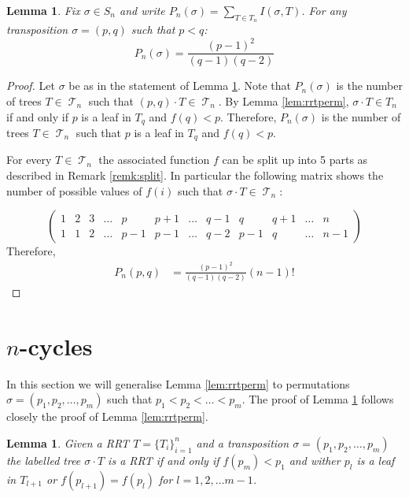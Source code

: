 \documentclass[10pt]{amsart} %
\newtheorem{lem}[thm]{Lemma}
\theoremstyle{definition}
\DeclareMathOperator{\T}{\mathcal{T}}
\begin{document}
\begin{lem}\label{lem:pn}
 Fix $ \sigma \in S_n$ and write $P_n(\sigma) = \sum_{T \in T_n}I(\sigma,T)$.  For any transposition $\sigma = (p,q)$ such that $p< q$:
 \[P_n(\sigma) = \frac{(p-1)^{2}}{(q-1)(q-2)}\] 
\end{lem}
\begin{proof}
Let $\sigma$ be as in the statement of Lemma \ref{lem:pn}. Note that $P_n(\sigma)$  is the number of trees $T \in \T_n$ such that $(p,q) \cdot T \in \T_n$. By Lemma \ref{lem:rrtperm},  $\sigma   \cdot T \in T_n$ if and only if $p$ is a leaf in $T_q$ and $f(q)< p$.  Therefore,  $P_n(\sigma)$ is the number of trees $T \in \T_n$ such that $p$ is a leaf in $T_q$ and $f(q)< p$.  

For every $T \in \T_n$ the associated function $f$ can be split up into 5 parts as described in Remark \ref{remk:split}. In particular the following matrix shows the number of possible values of $f(i)$ such that $\sigma \cdot T \in \T_n$:

 \[\left(\begin{array}{cccc|c|ccc|c|ccc}
     1  & 2  & 3 & \dots & p   & p+1 & \dots & q-1 & q    & q+1    & \dots & n \\
     1  & 1  & 2 & \dots & p-1 & p-1 & \dots & q-2 & p-1  & q      & \dots & n-1
    \end{array} \right)
\]
Therefore,  
\begin{align*}
 P_n(p,q) &= %
 \frac{(p-1)^2}{(q-1)(q-2)}(n-1)!
\end{align*}
\end{proof}



\section{$n$-cycles}
In this section we will generalise  Lemma \ref{lem:rrtperm} to permutations $\sigma = (p_1,p_2,\dots,p_m)$ such that $p_1 < p_2 < \dots < p_m $.  The proof of Lemma \ref{lem:mcycles} follows closely the proof of Lemma \ref{lem:rrtperm}.
\begin{lem}\label{lem:mcycles}
Given a RRT $T = \{T_{i}\}_{i=1}^{n}$ and a transposition $\sigma  = (p_1,p_2,\dots,p_m)$ the labelled tree $\sigma  \cdot T$ is a RRT if and only if  $f(p_m) < p_1$ \emph{and} wither $p_l$ is a leaf in $T_{l+1}$ \emph{or} $f(p_{l+1}) = f(p_l)$ for $l = 1,2,\dots m-1$.   
\end{lem}
\end{document}
